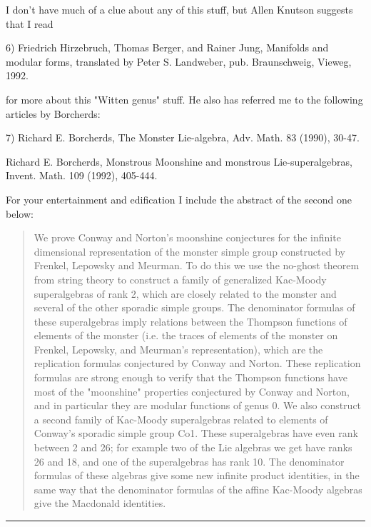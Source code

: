 I don't have much of a clue about any of this stuff, but Allen Knutson
suggests that I read

6) Friedrich Hirzebruch, Thomas Berger, and Rainer Jung, Manifolds and
modular forms, translated by Peter S. Landweber, pub. Braunschweig,
Vieweg, 1992.  

for more about this "Witten genus" stuff.  He also has referred me to 
the following articles by Borcherds:

7) Richard E. Borcherds, The Monster Lie-algebra, Adv. Math. 83 (1990),
30-47.

Richard E. Borcherds, Monstrous Moonshine and monstrous
Lie-superalgebras, Invent. Math. 109 (1992), 405-444.

For your entertainment and edification I include the abstract of the
second one below:

\begin{quote}
    We prove Conway and Norton's moonshine conjectures for the infinite
    dimensional representation of the monster simple group constructed by
    Frenkel, Lepowsky and Meurman. To do this we use the no-ghost theorem from
    string theory to construct a family of generalized Kac-Moody superalgebras
    of rank 2, which are closely related to the monster and several of the
    other sporadic simple groups. The denominator formulas of these
    superalgebras imply relations between the Thompson functions of elements of
    the monster (i.e. the traces of elements of the monster on Frenkel,
    Lepowsky, and Meurman's representation), which are the replication formulas
    conjectured by Conway and Norton. These replication formulas are strong
    enough to verify that the Thompson functions have most of the "moonshine"
    properties conjectured by Conway and Norton, and in particular they are
    modular functions of genus 0. We also construct a second family of
    Kac-Moody superalgebras related to elements of Conway's sporadic simple
    group Co1. These superalgebras have even rank between 2 and 26; for example
    two of the Lie algebras we get have ranks 26 and 18, and one of the
    superalgebras has rank 10. The denominator formulas of these algebras give
    some new infinite product identities, in the same way that the denominator
    formulas of the affine Kac-Moody algebras give the Macdonald identities.
\end{quote}


\par\noindent\rule{\textwidth}{0.4pt}
